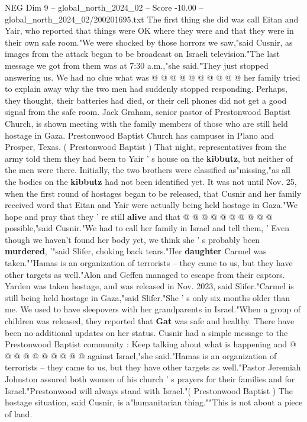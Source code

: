 \begin{textsample}{NEG Dim 9 – global\_north\_2024\_02 – Score -10.00 – global\_north\_2024\_02/200201695.txt}
The first thing she did was call Eitan and Yair, who reported that things were OK where they were and that they were in their own safe room."We were shocked by those horrors we saw,"said Cusnir, as images from the attack began to be broadcast on Israeli television."The last message we got from them was at 7:30 a.m.,"she said."They just stopped answering us.
We had no clue what was @ @ @ @ @ @ @ @ @ @ her family tried to explain away why the two men had suddenly stopped responding.
Perhaps, they thought, their batteries had died, or their cell phones did not get a good signal from the safe room.
Jack Graham, senior pastor of Prestonwood Baptist Church, is shown meeting with the family members of those who are still held hostage in Gaza.
Prestonwood Baptist Church has campuses in Plano and Prosper, Texas. ( Prestonwood Baptist ) That night, representatives from the army told them they had been to Yair ' s house on the \textbf{kibbutz}, but neither of the men were there.
Initially, the two brothers were classified as"missing,"as all the bodies on the \textbf{kibbutz} had not been identified yet.
It was not until Nov. 25, when the first round of hostages began to be released, that Cusnir and her family received word that Eitan and Yair were actually being held hostage in Gaza."We hope and pray that they ' re still \textbf{alive} and that @ @ @ @ @ @ @ @ @ @ possible,"said Cusnir."We had to call her family in Israel and tell them, ' Even though we haven't found her body yet, we think she ' s probably been \textbf{murdered}, '"said Slifer, choking back tears."Her \textbf{daughter} Carmel was taken.""Hamas is an organization of terrorists -- they came to us, but they have other targets as well."Alon and Geffen managed to escape from their captors.
Yarden was taken hostage, and was released in Nov. 2023, said Slifer."Carmel is still being held hostage in Gaza,"said Slifer."She ' s only six months older than me.
We used to have sleepovers with her grandparents in Israel."When a group of children was released, they reported that \textbf{Gat} was safe and healthy.
There have been no additional updates on her status.
Cusnir had a simple message to the Prestonwood Baptist community : Keep talking about what is happening and @ @ @ @ @ @ @ @ @ @ against Israel,"she said."Hamas is an organization of terrorists -- they came to us, but they have other targets as well."Pastor Jeremiah Johnston assured both women of his church ' s prayers for their families and for Israel."Prestonwood will always stand with Israel."( Prestonwood Baptist ) The hostage situation, said Cusnir, is a"humanitarian thing.""This is not about a piece of land.

\end{textsample}
